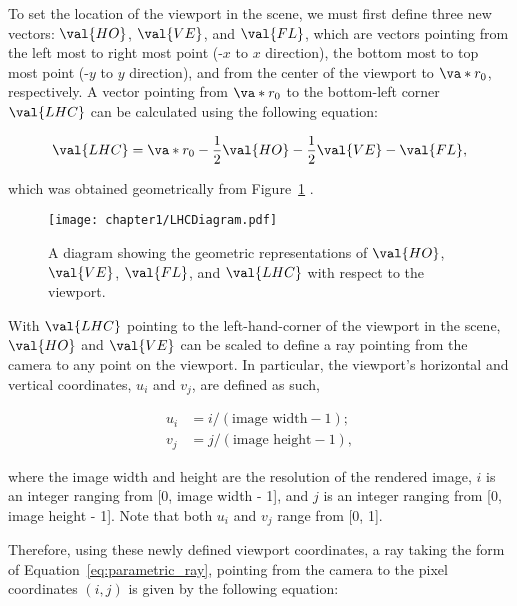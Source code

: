 \par To set the location of the viewport in the scene, we must first define three new vectors: $\val{HO}$, $\val{VE}$, and $\val{FL}$, which are vectors pointing from the left most to right most point (-$x$ to $x$ direction), the bottom most to top most point (-$y$ to $y$ direction), and from the center of the viewport to $\va*{r_0}$, respectively. A vector pointing from $\va*{r_0}$ to the bottom-left corner $\val{LHC}$ can be calculated using the following equation:

\begin{equation}
  \val{LHC} = \va*{r_0} - \frac{1}{2}\val{HO} - \frac{1}{2}\val{VE} - \val{FL},
  \label{eq:LHC}
\end{equation}

\noindent which was obtained geometrically from Figure~\ref{fig:LHC_diagram} \cite{Shirley}.

\begin{figure}[H]
    \centering
	\texttt{[image: chapter1/LHCDiagram.pdf]}
	\caption{A diagram showing the geometric representations of $\protect\val{HO}$, $\protect\val{VE}$,
   $\protect\val{FL}$, and $\protect\val{LHC}$ with respect to the viewport.}
	\label{fig:LHC_diagram}
\end{figure}

\par With $\val{LHC}$ pointing to the left-hand-corner of the viewport in the scene, $\val{HO}$ and $\val{VE}$ can be scaled to define a ray pointing from the camera to any point on the viewport. In particular,  the viewport's horizontal and vertical coordinates, $u_i$ and $v_j$, are defined as such,

\begin{align}
u_i &= i/(\text{image width} - 1);\\
v_j &= j/(\text{image height} - 1),
\label{eq:viewport_coords}
\end{align}

\noindent where the image width and height are the resolution of the rendered image, $i$ is an integer ranging from [0, image width - 1], and $j$ is an integer ranging from [0, image height - 1]. Note that both $u_i$ and $v_j$ range from [0, 1].

\par Therefore, using these newly defined viewport coordinates, a ray taking the form of Equation~\ref{eq:parametric_ray}, pointing from the camera to the pixel coordinates $(i, j)$ is given by the following equation:

